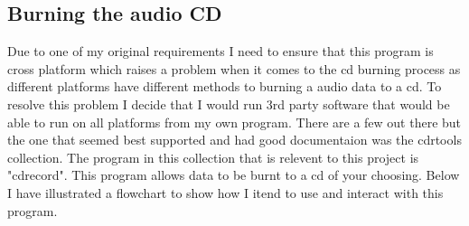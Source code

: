 \documentclass{article}
\begin{document}
\subsection{Burning the audio CD}
Due to one of my original requirements I need to ensure that this program is cross platform
which raises a problem when it comes to the cd burning process as different platforms have
different methods to burning a audio data to a cd. To resolve this problem I decide that
I would run 3rd party software that would be able to run on all platforms from my own
program. There are a few out there but the one that seemed best supported and had good
documentaion was the cdrtools collection. The program in this collection that is relevent
to this project is "cdrecord". This program allows data to be burnt to a cd of your choosing.
Below I have illustrated a flowchart to show how I itend to use and interact with this
program.
\end{document}
